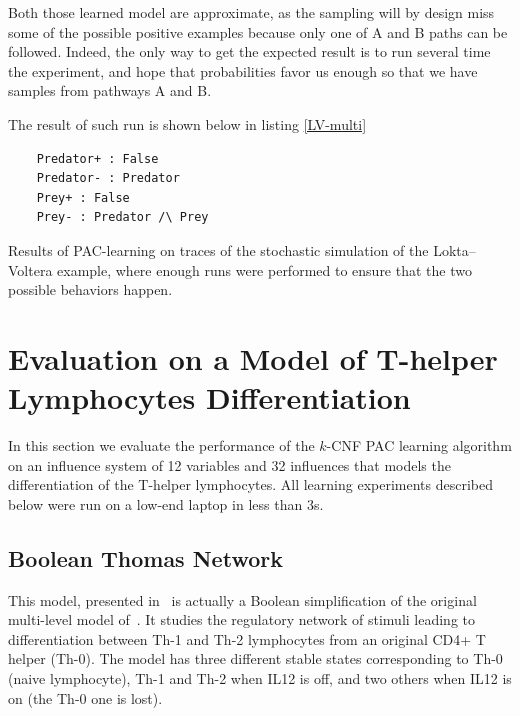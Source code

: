 \documentclass{llncs}
\begin{document}
Both those learned model are approximate, as the sampling will by design miss some of the possible positive examples because only one of A and B paths can be followed.
Indeed, the only way to get the expected result is to run several time the experiment, and hope that probabilities favor us enough so that we have samples from pathways A and B.

The result of such run is shown below in listing \ref{LV-multi}
\begin{listfig}
	\begin{verbatim}
	Predator+ : False
	Predator- : Predator
	Prey+ : False
	Prey- : Predator /\ Prey
	\end{verbatim}
	\vspace{-1em}
	\caption{Results of PAC-learning on traces of the stochastic simulation of the
		Lokta--Voltera example, where enough runs were performed to ensure that the two possible behaviors happen.\label{LV-multi}}
\end{listfig}


\section{Evaluation on a Model of T-helper Lymphocytes Differentiation}\label{ex:lympho}


In this section we evaluate the performance of the $k$-CNF PAC learning
algorithm on an influence system of 12 variables and 32 influences that models
the differentiation of the T-helper lymphocytes.
All learning experiments described below were run on a
low-end laptop in less than 3s.

\subsection{Boolean Thomas Network}

This model, presented in~\cite{RRMTC06tcsb} is actually a Boolean
simplification of the original multi-level model
of~\cite{Mendoza06biosystems}. It studies the regulatory network of stimuli
leading to differentiation between Th-1 and Th-2 lymphocytes from an original
CD4+ T helper (Th-0).
The model has three different stable states corresponding to Th-0 (naive
lymphocyte), Th-1 and Th-2 when IL12 is off, and two others when IL12 is on
(the Th-0 one is lost).
\end{document}
